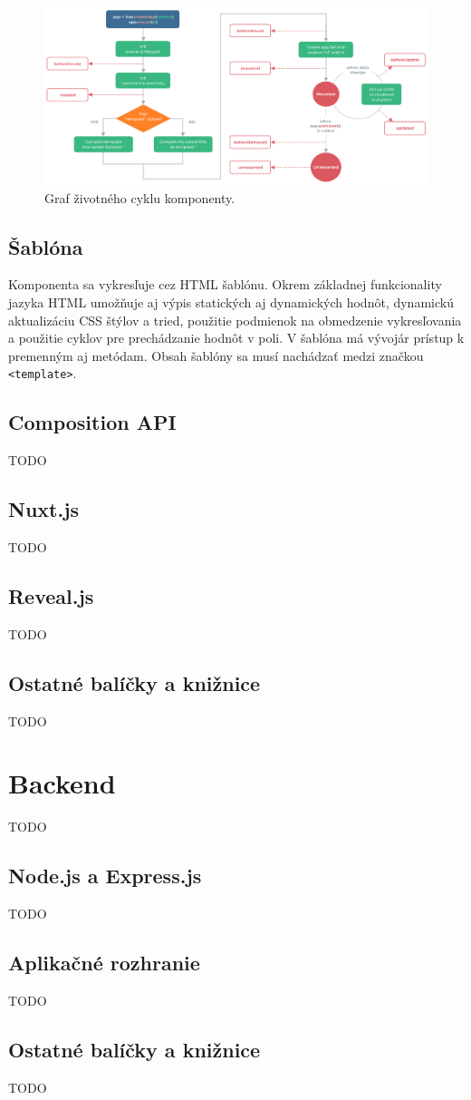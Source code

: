     \begin{figure}[!hbt]
        \centering
        \includegraphics[scale=0.3]{obrazky/lifecycle.png}
        \caption{Graf životného cyklu komponenty\cite{vue-guide}.}
        \label{pic:components}
    \end{figure}

\subsection*{Šablóna}
Komponenta sa vykresľuje cez HTML šablónu. Okrem základnej funkcionality jazyka HTML umožňuje aj výpis statických aj dynamických hodnôt, dynamickú aktualizáciu CSS štýlov a tried, použitie podmienok na obmedzenie vykresľovania a použitie cyklov pre prechádzanie hodnôt v poli. V šablóna má vývojár prístup k premenným aj metódam. Obsah šablóny sa musí nachádzať medzi značkou \texttt{<template>}.

\subsection{Composition API}
\label{compositionapi}
TODO

\subsection{Nuxt.js}
TODO

\subsection{Reveal.js}
TODO

\subsection{Ostatné balíčky a knižnice}
TODO

\section{Backend}
TODO

\subsection{Node.js a Express.js}
\label{node}
TODO

\subsection{Aplikačné rozhranie}
TODO

\subsection{Ostatné balíčky a knižnice}
TODO